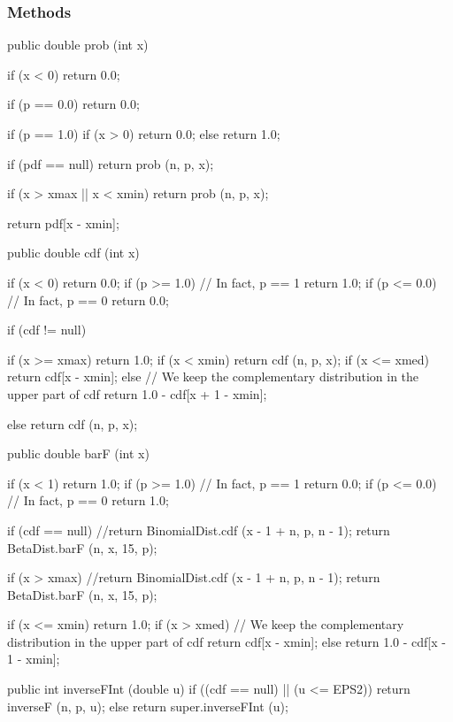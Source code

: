 \subsubsection* {Methods}
\begin{code}\begin{hide}
   public double prob (int x) {
      if (x < 0)
         return 0.0;

      if (p == 0.0)
         return 0.0;

      if (p == 1.0) {
         if (x > 0)
            return 0.0;
         else
            return 1.0;
      }

      if (pdf == null)
         return prob (n, p, x);

      if (x > xmax || x < xmin)
         return prob (n, p, x);

      return pdf[x - xmin];
   }

   public double cdf (int x) {
      if (x < 0)
         return 0.0;
      if (p >= 1.0)    // In fact, p == 1
         return 1.0;
      if (p <= 0.0)    // In fact, p == 0
         return 0.0;

      if (cdf != null) {
         if (x >= xmax)
            return 1.0;
         if (x < xmin)
            return cdf (n, p, x);
         if (x <= xmed)
            return cdf[x - xmin];
         else
            // We keep the complementary distribution in the upper part of cdf
            return 1.0 - cdf[x + 1 - xmin];

      }
      else
         return cdf (n, p, x);
   }

   public double barF (int x) {
      if (x < 1)
         return 1.0;
      if (p >= 1.0)   // In fact, p == 1
         return 0.0;
      if (p <= 0.0)   // In fact, p == 0
         return 1.0;

      if (cdf == null)
         //return BinomialDist.cdf (x - 1 + n, p, n - 1);
         return BetaDist.barF (n, x, 15, p);

      if (x > xmax)
         //return BinomialDist.cdf (x - 1 + n, p, n - 1);
         return BetaDist.barF (n, x, 15, p);

      if (x <= xmin)
         return 1.0;
      if (x > xmed)
         // We keep the complementary distribution in the upper part of cdf
         return cdf[x - xmin];
      else
         return 1.0 - cdf[x - 1 - xmin];
   }

   public int inverseFInt (double u) {
      if ((cdf == null) || (u <= EPS2))
         return inverseF (n, p, u);
      else
         return super.inverseFInt (u);
   }


\end{hide}
\end{code}
